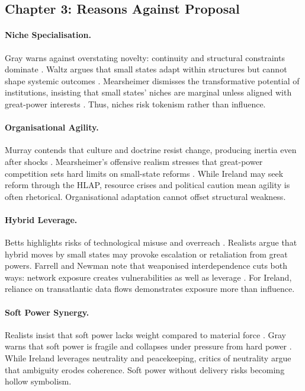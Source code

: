 \subsection*{Chapter 3: Reasons Against Proposal}
\paragraph{Niche Specialisation.}  
Gray warns against overstating novelty: continuity and structural constraints dominate \parencite{GRAY_2005}. Waltz argues that small states adapt within structures but cannot shape systemic outcomes \parencite{WALTZ_1979}. Mearsheimer dismisses the transformative potential of institutions, insisting that small states’ niches are marginal unless aligned with great-power interests \parencite{MEARSHEIMER_1994}. Thus, niches risk tokenism rather than influence.

\paragraph{Organisational Agility.}  
Murray contends that culture and doctrine resist change, producing inertia even after shocks \parencite{MURRAY_2001}. Mearsheimer’s offensive realism stresses that great-power competition sets hard limits on small-state reforms \parencite{MEARSHEIMER_2019}. While Ireland may seek reform through the HLAP, resource crises and political caution mean agility is often rhetorical. Organisational adaptation cannot offset structural weakness.

\paragraph{Hybrid Leverage.}  
Betts highlights risks of technological misuse and overreach \parencite{BETTS_1996}. Realists argue that hybrid moves by small states may provoke escalation or retaliation from great powers. Farrell and Newman note that weaponised interdependence cuts both ways: network exposure creates vulnerabilities as well as leverage \parencite{FARRELL_2019}. For Ireland, reliance on transatlantic data flows demonstrates exposure more than influence.

\paragraph{Soft Power Synergy.}  
Realists insist that soft power lacks weight compared to material force \parencite{WALTZ_1979, MEARSHEIMER_2019}. Gray warns that soft power is fragile and collapses under pressure from hard power \parencite{GRAY_2005}. While Ireland leverages neutrality and peacekeeping, critics of neutrality argue that ambiguity erodes coherence. Soft power without delivery risks becoming hollow symbolism.

